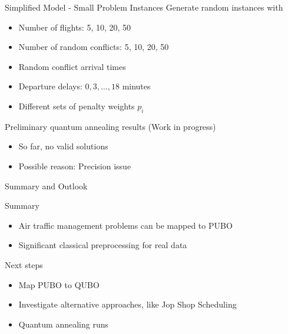 \documentclass[10pt]{beamer}
\begin{document}
\begin{frame}[t]{Simplified Model - Small Problem Instances}
    Generate random instances with
    \begin{itemize}
        \item Number of flights: 5, 10, 20, 50
        \item Number of random conflicts: 5, 10, 20, 50
        \item Random conflict arrival times
        \item Departure delays: $0, 3, \dots, 18$ minutes
        \item Different sets of penalty weights $p_i$
    \end{itemize}
    \begin{block}
        {Preliminary quantum annealing results (Work in progress)}
        \begin{itemize}
            \item So far, no valid solutions
            \item Possible reason: Precision issue
        \end{itemize}
    \end{block}
\end{frame}
\begin{frame}[t]{Summary and Outlook}
    \begin{block}{Summary}
        \begin{itemize}
            \item Air traffic management problems can be mapped to PUBO
            \item Significant classical preprocessing for real data
        \end{itemize}
    \end{block}
    \begin{block}{Next steps}
        \begin{itemize}
            \item Map PUBO to QUBO
            \item Investigate alternative approaches, like Jop Shop Scheduling
            \item Quantum annealing runs
        \end{itemize}
    \end{block}
\end{frame}
\end{document}
